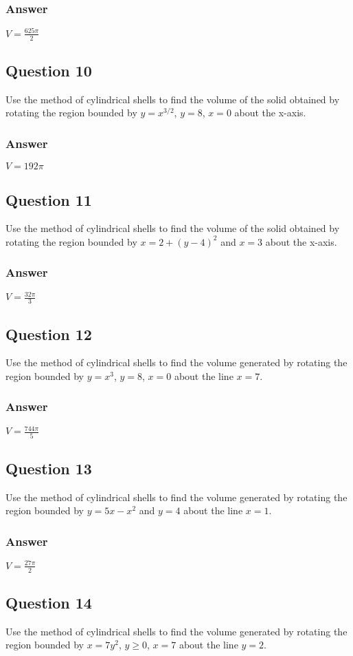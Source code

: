 \documentclass{article}
\begin{document}
\subsubsection*{Answer}
$ V = \frac{625\pi}{2} $

\subsection*{Question 10}
Use the method of cylindrical shells to find the volume of the solid obtained by rotating the region bounded by $y=x^{3/2}$, $y=8$, $x=0$ about the x-axis.
\subsubsection*{Answer}
$ V = 192\pi $

\subsection*{Question 11}
Use the method of cylindrical shells to find the volume of the solid obtained by rotating the region bounded by $x=2+(y-4)^2$ and $x=3$ about the x-axis.
\subsubsection*{Answer}
$ V = \frac{32\pi}{3} $

\subsection*{Question 12}
Use the method of cylindrical shells to find the volume generated by rotating the region bounded by $y=x^3$, $y=8$, $x=0$ about the line $x=7$.
\subsubsection*{Answer}
$ V = \frac{744\pi}{5} $

\subsection*{Question 13}
Use the method of cylindrical shells to find the volume generated by rotating the region bounded by $y=5x-x^2$ and $y=4$ about the line $x=1$.
\subsubsection*{Answer}
$ V = \frac{27\pi}{2} $

\subsection*{Question 14}
Use the method of cylindrical shells to find the volume generated by rotating the region bounded by $x=7y^2$, $y \ge 0$, $x=7$ about the line $y=2$.
\end{document}
